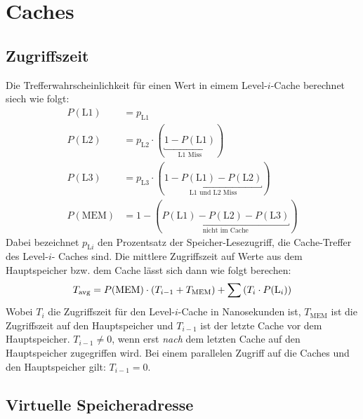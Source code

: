 \section{Caches}

\subsection{Zugriffszeit}
Die Trefferwahrscheinlichkeit für einen Wert in eimem Level-$i$-Cache berechnet siech wie folgt:
\begin{align*}
    P(\text{L1}) &= p_{\text{L1}}                                                                                   \\
    P(\text{L2}) &= p_{\text{L2}} \cdot (\underbracket{1 - P(\text{L1})}_{\text{L1 Miss}})                          \\
    P(\text{L3}) &= p_{\text{L3}} \cdot (\underbracket{1 - P(\text{L1}) - P(\text{L2})}_{\text{L1 und L2 Miss}})    \\
    P(\text{MEM}) &= 1 - (\underbracket{P(\text{L1}) - P(\text{L2}) - P(\text{L3})}_{\text{nicht im Cache}})
\end{align*}
Dabei bezeichnet $p_{\text{L}i}$ den Prozentsatz der Speicher-Lesezugriff, die Cache-Treffer des Level-$i$-
Caches sind. Die mittlere Zugriffszeit auf Werte aus dem Hauptspeicher bzw. dem Cache lässt sich dann wie
folgt berechen:
\[
 T_{\text{avg}} = P(\text{MEM}) \cdot \left( T_{i - 1} + T_{\text{MEM}} \right) + \sum\left( T_{i} \cdot P(\text{L}_{i}) \right) 
\]
Wobei $T_{i}$ die Zugriffszeit für den Level-$i$-Cache in Nanosekunden ist, $T_{\text{MEM}}$ ist die
Zugriffszeit auf den Hauptspeicher und $T_{i - 1}$ ist der letzte Cache vor dem Hauptspeicher.
\important
$T_{i - 1} \neq 0$, wenn erst \emph{nach} dem letzten Cache auf den Hauptspeicher zugegriffen wird. Bei 
einem parallelen Zugriff auf die Caches und den Hauptspeicher gilt: $T_{i - 1} = 0$.

\subsection{Virtuelle Speicheradresse}

\begin{center}
\end{center}

